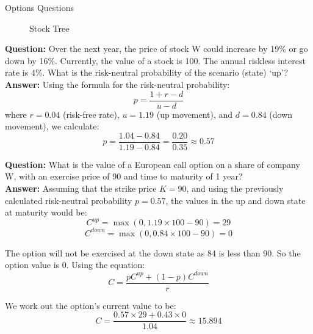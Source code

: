 \begin{examplebox}{Options Questions}

\begin{figure}[H]
    \centering
      \caption{Stock Tree}
\end{figure}

      
    \textbf{Question:} Over the next year, the price of stock W could increase by 19\% or go down by 16\%. Currently, the value of a stock is 100. The annual riskless interest rate is 4\%. What is the risk-neutral probability of the scenario (state) `up'?\\

\textbf{Answer:}
Using the formula for the risk-neutral probability:
\[
p = \frac{1 + r - d}{u - d}
\]
where \( r = 0.04 \) (risk-free rate), \( u = 1.19 \) (up movement), and \( d = 0.84 \) (down movement), we calculate:
\[
p = \frac{1.04 - 0.84}{1.19 - 0.84} = \frac{0.20}{0.35} \approx 0.57
\]

\textbf{Question:} What is the value of a European call option on a share of company W, with an exercise price of 90 and time to maturity of 1 year?\\

\textbf{Answer:}
Assuming that the strike price \( K = 90 \), and using the previously calculated risk-neutral probability \( p = 0.57 \), the values in the up and down state at maturity would be:
\[
C^{up} = \max(0, 1.19 \times 100 - 90) = 29
\]
\[
C^{down} = \max(0, 0.84 \times 100 - 90) = 0
\]

The option will not be exercised at the down state as 84 is less than 90. So the option value is 0. Using the equation:
\begin{equation}
    C = \frac{pC^{up}+(1-p)C^{down}}{r}
\end{equation}

We work out the option's current value to be:
\[
C = \frac{0.57 \times 29 + 0.43 \times 0}{1.04} \approx 15.894
\]

\begin{figure}[H]
    \centering
\end{figure}
\end{examplebox}
